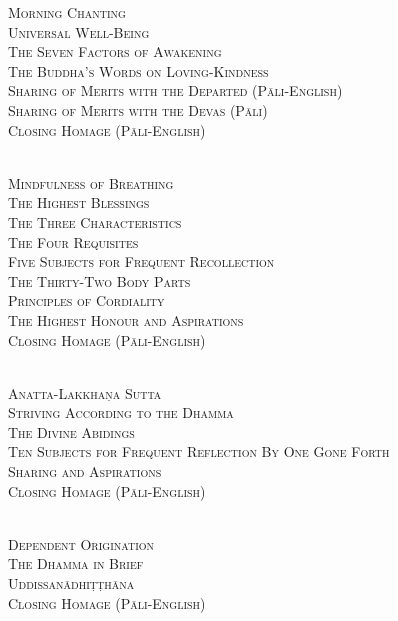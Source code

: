 \begin{center}
  \textsc{Morning Chanting\\
    Universal Well-Being\\
    The Seven Factors of Awakening\\
    The Buddha’s Words on Loving-Kindness\\
    Sharing of Merits with the Departed (Pāli-English)\\
    Sharing of Merits with the Devas (Pāli)\\
    Closing Homage (Pāli-English)}\\

  \bigskip

  {\libertinusFont\selectfont\textbf{\textsc{}}}\\

  \textsc{Mindfulness of Breathing\\
    The Highest Blessings\\
    The Three Characteristics\\
    The Four Requisites\\
    Five Subjects for Frequent Recollection\\
    The Thirty-Two Body Parts\\
    Principles of Cordiality\\
    The Highest Honour and Aspirations\\
    Closing Homage (Pāli-English)}\\

  \bigskip

  {\libertinusFont\selectfont\textbf{\textsc{}}}\\

  \textsc{Anatta-Lakkhaṇa Sutta\\
    Striving According to the Dhamma\\
    The Divine Abidings\\
    Ten Subjects for Frequent Reflection By One Gone Forth\\
    Sharing and Aspirations\\
    Closing Homage (Pāli-English)}\\

  \bigskip
  \clearpage

  {\libertinusFont\selectfont\textbf{\textsc{}}}\\

  \textsc{Dependent Origination\\
    The Dhamma in Brief\\
    Uddissanādhiṭṭhāna\\
    Closing Homage (Pāli-English)}\\


\end{center}
